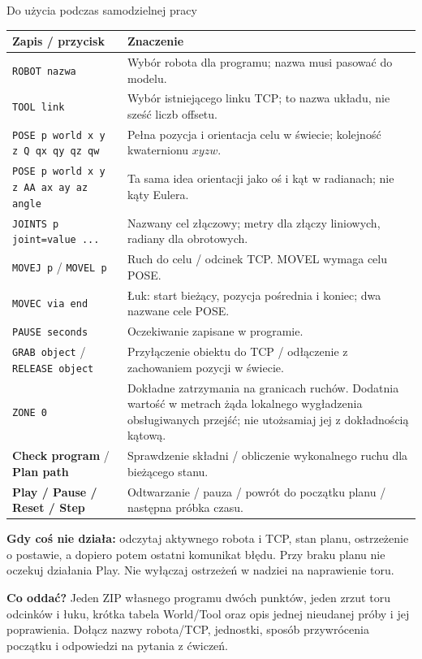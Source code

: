 \documentclass[10pt,a4paper]{article}
\newcommand{\ui}[1]{\textbf{\textsf{#1}}}
\newcommand{\cmd}[1]{\texttt{#1}}
\newcommand{\page}[2]{\clearpage{\Large\bfseries\color{navy}#1}\par{\small\color{accent}#2}\par\vspace{3pt}}
\begin{document}
\page{Ściąga: program, stan i oddanie ćwiczenia}{Do użycia podczas samodzielnej pracy}
\begin{tabularx}{\linewidth}{@{}p{68mm}X@{}}\toprule
\textbf{Zapis / przycisk}&\textbf{Znaczenie}\\\midrule
\cmd{ROBOT nazwa}&Wybór robota dla programu; nazwa musi pasować do modelu.\\
\cmd{TOOL link}&Wybór istniejącego linku TCP; to nazwa układu, nie sześć liczb offsetu.\\
\cmd{POSE p world x y z Q qx qy qz qw}&Pełna pozycja i orientacja celu w świecie; kolejność kwaternionu \(xyzw\).\\
\cmd{POSE p world x y z AA ax ay az angle}&Ta sama idea orientacji jako oś i kąt w radianach; nie kąty Eulera.\\
\cmd{JOINTS p joint=value ...}&Nazwany cel złączowy; metry dla złączy liniowych, radiany dla obrotowych.\\
\cmd{MOVEJ p} / \cmd{MOVEL p}&Ruch do celu / odcinek TCP. MOVEL wymaga celu POSE.\\
\cmd{MOVEC via end}&Łuk: start bieżący, pozycja pośrednia i koniec; dwa nazwane cele POSE.\\
\cmd{PAUSE seconds}&Oczekiwanie zapisane w programie.\\
\cmd{GRAB object} / \cmd{RELEASE object}&Przyłączenie obiektu do TCP / odłączenie z zachowaniem pozycji w świecie.\\
\cmd{ZONE 0}&Dokładne zatrzymania na granicach ruchów. Dodatnia wartość w metrach żąda lokalnego wygładzenia obsługiwanych przejść; nie utożsamiaj jej z dokładnością kątową.\\
\ui{Check program} / \ui{Plan path}&Sprawdzenie składni / obliczenie wykonalnego ruchu dla bieżącego stanu.\\
\ui{Play / Pause / Reset / Step}&Odtwarzanie / pauza / powrót do początku planu / następna próbka czasu.\\\bottomrule
\end{tabularx}
\begin{remember}\textbf{Gdy coś nie działa:} odczytaj aktywnego robota i TCP, stan planu, ostrzeżenie o postawie, a dopiero potem ostatni komunikat błędu. Przy braku planu nie oczekuj działania Play. Nie wyłączaj ostrzeżeń w nadziei na naprawienie toru.\end{remember}
\textbf{Co oddać?} Jeden ZIP własnego programu dwóch punktów, jeden zrzut toru odcinków i łuku, krótka tabela World/Tool oraz opis jednej nieudanej próby i jej poprawienia. Dołącz nazwy robota/TCP, jednostki, sposób przywrócenia początku i odpowiedzi na pytania z ćwiczeń.
\end{document}
